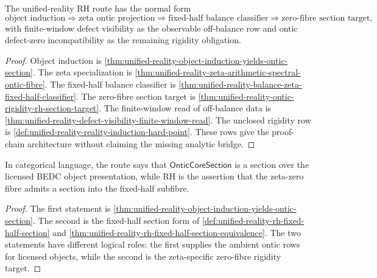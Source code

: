 \begin{theorem}
\label{thm:unified-reality-reality-induction-normal-form-rh-route}
The unified-reality RH route has the normal form
$$
\text{object induction}
\Rightarrow
\text{zeta ontic projection}
\Rightarrow
\text{fixed-half balance classifier}
\Rightarrow
\text{zero-fibre section target},
$$
with finite-window defect visibility as the observable off-balance row
and ontic defect-zero incompatibility as the remaining rigidity
obligation.
\end{theorem}

\begin{proof}
Object induction is
\autoref{thm:unified-reality-object-induction-yields-ontic-section}.  The
zeta specialization is
\autoref{thm:unified-reality-zeta-arithmetic-spectral-ontic-fibre}.  The
fixed-half balance classifier is
\autoref{thm:unified-reality-balance-zeta-fixed-half-classifier}.  The
zero-fibre section target is
\autoref{thm:unified-reality-ontic-rigidity-rh-section-target}.  The
finite-window read of off-balance data is
\autoref{thm:unified-reality-defect-visibility-finite-window-read}.  The
unclosed rigidity row is
\autoref{def:unified-reality-reality-induction-hard-point}.  These rows
give the proof-chain architecture without claiming the missing analytic
bridge.
\end{proof}

\begin{corollary}
\label{cor:unified-reality-categorical-reading-object-induction-rh}
In categorical language, the route says that
$\mathsf{OnticCoreSection}$ is a section over the licensed BEDC object
presentation, while RH is the assertion that the zeta-zero fibre admits
a section into the fixed-half subfibre.
\end{corollary}

\begin{proof}
The first statement is
\autoref{thm:unified-reality-object-induction-yields-ontic-section}.  The
second is the fixed-half section form of
\autoref{def:unified-reality-rh-fixed-half-section} and
\autoref{thm:unified-reality-rh-fixed-half-section-equivalence}.  The
two statements have different logical roles: the first supplies the
ambient ontic rows for licensed objects, while the second is the
zeta-specific zero-fibre rigidity target.
\end{proof}
